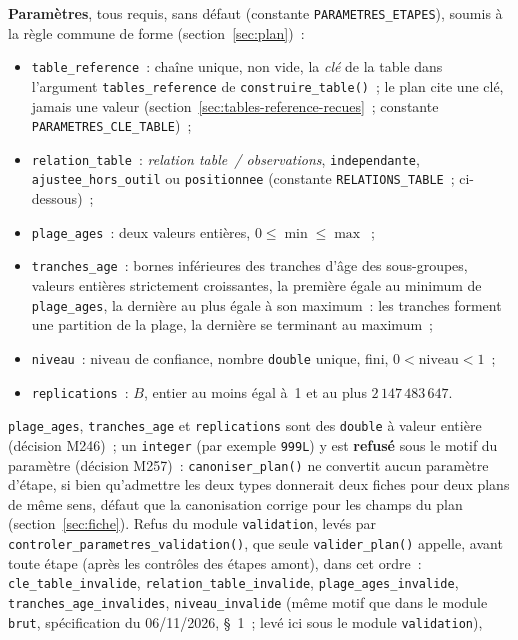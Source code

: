 \documentclass[a4paper,11pt]{article}
\newcommand{\code}[1]{\texttt{\small #1}}
\begin{document}
\medskip
{\sloppy \textbf{Paramètres}, tous requis, sans défaut (constante
\code{PARAMETRES\_ETAPES}), soumis à la règle commune de forme
(section~\ref{sec:plan})~:
\begin{itemize}[leftmargin=*, itemsep=2pt]
  \item \code{table\_reference}~: chaîne unique, non vide, la \emph{clé} de
    la table dans l'argument \code{tables\_reference} de
    \code{construire\_table()}~; le plan cite une clé, jamais une valeur
    (section~\ref{sec:tables-reference-recues}~; constante
    \code{PARAMETRES\_CLE\_TABLE})~;
  \item \code{relation\_table}~: \emph{relation table~/ observations},
    \code{independante}, \code{ajustee\_hors\_outil} ou
    \code{positionnee} (constante \code{RELATIONS\_TABLE}~; ci-dessous)~;
  \item \code{plage\_ages}~: deux valeurs entières, $0 \le \min \le \max$~;
  \item \code{tranches\_age}~: bornes inférieures des tranches d'âge des
    sous-groupes, valeurs entières strictement croissantes, la première égale
    au minimum de \code{plage\_ages}, la dernière au plus égale à son
    maximum~: les tranches forment une partition de la plage, la dernière se
    terminant au maximum~;
  \item \code{niveau}~: niveau de confiance, nombre \code{double} unique,
    fini, $0 < \text{niveau} < 1$~;
  \item \code{replications}~: $B$, entier au moins égal à~1 et au plus
    $2\,147\,483\,647$.
\end{itemize}\par}
\code{plage\_ages}, \code{tranches\_age} et \code{replications} sont des
\code{double} à valeur entière (décision M246)~; un \code{integer} (par
exemple \code{999L}) y est \textbf{refusé} sous le motif du paramètre
(décision M257)~: \code{canoniser\_plan()} ne convertit aucun paramètre
d'étape, si bien qu'admettre les deux types donnerait deux fiches pour deux
plans de même sens, défaut que la canonisation corrige pour les champs du
plan (section~\ref{sec:fiche}). Refus du module \code{validation}, levés par
\code{controler\_parametres\_validation()}, que seule \code{valider\_plan()}
appelle, avant toute étape (après les contrôles des étapes amont), dans
cet ordre~:
\code{cle\_table\_invalide}, \code{relation\_table\_invalide},
\code{plage\_ages\_invalide}, \code{tranches\_age\_invalides},
\code{niveau\_invalide} (même motif que dans le module \code{brut},
spécification du 06/11/2026, §~1~; levé ici sous le module \code{validation}),
\end{document}

